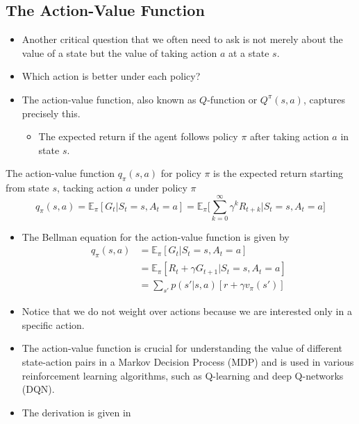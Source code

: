 



\subsection{The Action-Value Function}
\begin{itemize}
	\item Another critical question that we often need to ask is not merely about the value of a state but the value of taking action $a$ at a state $s$.
	\item Which action is better under each policy?
	\item The action-value function, also known as $Q$-function or $Q^\pi(s,a)$, captures precisely this.
		\begin{itemize}
			\item The expected return if the agent follows policy $\pi$ after taking action $a$ in state $s$.
		\end{itemize}
\end{itemize}

\begin{definition}
	The action-value function $q_{\pi}(s,a)$ for policy $\pi$ is the expected return starting from state $s$, tacking action $a$ under policy $\pi$
	$$q_{\pi}(s,a) = \mathbb{E}_\pi[G_t|S_t=s, A_t=a]=\mathbb{E}_\pi\Bigg[\sum_{k=0}^{\infty}\gamma^k R_{t+k}\Bigg| S_t=s, A_t=a\Bigg]$$
\end{definition}

\begin{itemize}
	\item The Bellman equation for the action-value function is given by
	\begin{align*}
		q_{\pi}(s,a) &= \mathbb{E}_\pi[G_t|S_t=s, A_t=a]\\
		& = \mathbb{E}_\pi[R_{t} + \gamma G_{t+1}|S_t=s, A_t=a]\\
		& = \sum_{s'}p(s'|s,a)[r + \gamma v_\pi(s')]
	\end{align*}
	\item Notice that we do not weight over actions because we are interested only in a specific action.
	\item The action-value function is crucial for understanding the value of different state-action pairs in a Markov Decision Process (MDP) and is used in various reinforcement learning algorithms, such as Q-learning and deep Q-networks (DQN).
	\item The derivation is given in 
\end{itemize}

